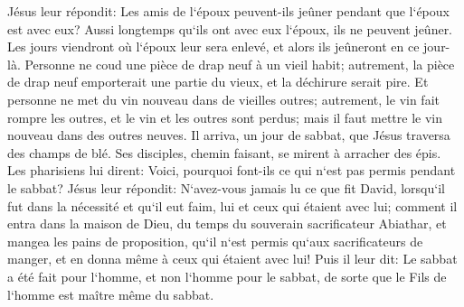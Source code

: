 \verse Jésus leur répondit: Les amis de l`époux peuvent-ils jeûner pendant que l`époux est avec eux? Aussi longtemps qu`ils ont avec eux l`époux, ils ne peuvent jeûner. 
\verse Les jours viendront où l`époux leur sera enlevé, et alors ils jeûneront en ce jour-là. 
\verse Personne ne coud une pièce de drap neuf à un vieil habit; autrement, la pièce de drap neuf emporterait une partie du vieux, et la déchirure serait pire. 
\verse Et personne ne met du vin nouveau dans de vieilles outres; autrement, le vin fait rompre les outres, et le vin et les outres sont perdus; mais il faut mettre le vin nouveau dans des outres neuves. 
\verse Il arriva, un jour de sabbat, que Jésus traversa des champs de blé. Ses disciples, chemin faisant, se mirent à arracher des épis. 
\verse Les pharisiens lui dirent: Voici, pourquoi font-ils ce qui n`est pas permis pendant le sabbat? 
\verse Jésus leur répondit: N`avez-vous jamais lu ce que fit David, lorsqu`il fut dans la nécessité et qu`il eut faim, lui et ceux qui étaient avec lui; 
\verse comment il entra dans la maison de Dieu, du temps du souverain sacrificateur Abiathar, et mangea les pains de proposition, qu`il n`est permis qu`aux sacrificateurs de manger, et en donna même à ceux qui étaient avec lui! 
\verse Puis il leur dit: Le sabbat a été fait pour l`homme, et non l`homme pour le sabbat, 
\verse de sorte que le Fils de l`homme est maître même du sabbat. 

